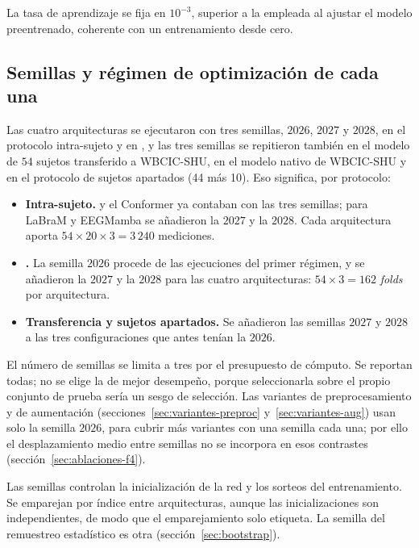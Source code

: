 La tasa de aprendizaje se fija en $10^{-3}$, superior a la empleada al ajustar el
modelo preentrenado, coherente con un entrenamiento desde cero.

\subsection{Semillas y régimen de optimización de cada una}
\label{sec:semillas-metodo}\label{sec:fase3-variantes}

Las cuatro arquitecturas se ejecutaron con tres semillas, $2026$, $2027$ y $2028$, en el
protocolo intra-sujeto y en \loso{}, y las tres semillas se repitieron también en el modelo
de $54$ sujetos transferido a WBCIC-SHU, en el modelo nativo de WBCIC-SHU y en el protocolo
de sujetos apartados (44 más 10). Eso significa, por protocolo:

\begin{itemize}
  \item \textbf{Intra-sujeto.} \eegnet{} y el Conformer ya contaban con las tres semillas;
  para LaBraM y EEGMamba se añadieron la $2027$ y la $2028$. Cada arquitectura aporta
  $54 \times 20 \times 3 = 3\,240$ mediciones.
  \item \textbf{\loso{}.} La semilla $2026$ procede de las ejecuciones del primer régimen, y se
  añadieron la $2027$ y la $2028$ para las cuatro arquitecturas: $54 \times 3 = 162$
  \textit{folds} por arquitectura.
  \item \textbf{Transferencia y sujetos apartados.} Se añadieron las semillas $2027$ y
  $2028$ a las tres configuraciones que antes tenían la $2026$.
\end{itemize}

El número de semillas se limita a tres por el presupuesto de cómputo. Se reportan todas; no
se elige la de mejor desempeño, porque seleccionarla sobre el propio conjunto de prueba
sería un sesgo de selección. Las variantes de preprocesamiento y de aumentación
(secciones~\ref{sec:variantes-preproc} y~\ref{sec:variantes-aug}) usan solo la semilla
$2026$, para cubrir más variantes con una semilla cada una; por ello el desplazamiento medio
entre semillas no se incorpora en esos contrastes (sección~\ref{sec:ablaciones-f4}).

Las semillas controlan la inicialización de la red y los sorteos del entrenamiento. Se
emparejan por índice entre arquitecturas, aunque las inicializaciones son independientes, de
modo que el emparejamiento solo etiqueta. La semilla del remuestreo estadístico es otra
(sección~\ref{sec:bootstrap}).

